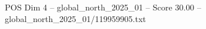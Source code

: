 \begin{textsample}{POS Dim 4 – global\_north\_2025\_01 – Score 30.00 – global\_north\_2025\_01/119959905.txt}
\end{textsample}
